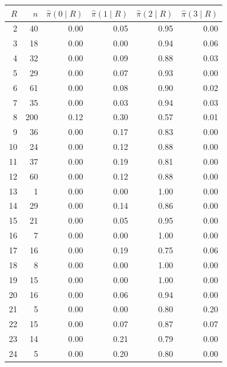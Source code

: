 \begin{tabular}{rrrrrr}
\toprule
$R$ & $n$ & $\hat\pi(0\mid R)$ & $\hat\pi(1\mid R)$ & $\hat\pi(2\mid R)$ & $\hat\pi(3\mid R)$ \\
\midrule
2 & 40 & 0.00 & 0.05 & 0.95 & 0.00 \\
3 & 18 & 0.00 & 0.00 & 0.94 & 0.06 \\
4 & 32 & 0.00 & 0.09 & 0.88 & 0.03 \\
5 & 29 & 0.00 & 0.07 & 0.93 & 0.00 \\
6 & 61 & 0.00 & 0.08 & 0.90 & 0.02 \\
7 & 35 & 0.00 & 0.03 & 0.94 & 0.03 \\
8 & 200 & 0.12 & 0.30 & 0.57 & 0.01 \\
9 & 36 & 0.00 & 0.17 & 0.83 & 0.00 \\
10 & 24 & 0.00 & 0.12 & 0.88 & 0.00 \\
11 & 37 & 0.00 & 0.19 & 0.81 & 0.00 \\
12 & 60 & 0.00 & 0.12 & 0.88 & 0.00 \\
13 & 1 & 0.00 & 0.00 & 1.00 & 0.00 \\
14 & 29 & 0.00 & 0.14 & 0.86 & 0.00 \\
15 & 21 & 0.00 & 0.05 & 0.95 & 0.00 \\
16 & 7 & 0.00 & 0.00 & 1.00 & 0.00 \\
17 & 16 & 0.00 & 0.19 & 0.75 & 0.06 \\
18 & 8 & 0.00 & 0.00 & 1.00 & 0.00 \\
19 & 15 & 0.00 & 0.00 & 1.00 & 0.00 \\
20 & 16 & 0.00 & 0.06 & 0.94 & 0.00 \\
21 & 5 & 0.00 & 0.00 & 0.80 & 0.20 \\
22 & 15 & 0.00 & 0.07 & 0.87 & 0.07 \\
23 & 14 & 0.00 & 0.21 & 0.79 & 0.00 \\
24 & 5 & 0.00 & 0.20 & 0.80 & 0.00 \\
\bottomrule
\end{tabular}

